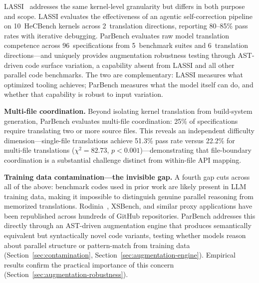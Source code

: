 \documentclass[conference]{IEEEtran}
\begin{document}
LASSI~\cite{LASSI2024} addresses the same kernel-level granularity but differs in both purpose and scope. LASSI evaluates the effectiveness of an agentic self-correction pipeline on 10~HeCBench kernels across 2~translation directions, reporting 80--85\% pass rates with iterative debugging. ParBench evaluates raw model translation competence across 96~specifications from 5~benchmark suites and 6~translation directions---and uniquely provides augmentation robustness testing through AST-driven code surface variation, a capability absent from LASSI and all other parallel code benchmarks. The two are complementary: LASSI measures what optimized tooling achieves; ParBench measures what the model itself can do, and whether that capability is robust to input variation.

\textbf{Multi-file coordination.} Beyond isolating kernel translation from build-system generation, ParBench evaluates multi-file coordination: 25\% of specifications require translating two or more source files. This reveals an independent difficulty dimension---single-file translations achieve 51.3\% pass rate versus 22.2\% for multi-file translations ($\chi^2 = 82.73$, $p < 0.001$)---demonstrating that file-boundary coordination is a substantial challenge distinct from within-file API mapping.

\textbf{Training data contamination---the invisible gap.} A fourth gap cuts across all of the above: benchmark codes used in prior work are likely present in LLM training data, making it impossible to distinguish genuine parallel reasoning from memorized translations. Rodinia~\cite{Rodinia2009}, XSBench, and similar proxy applications have been republished across hundreds of GitHub repositories. ParBench addresses this directly through an AST-driven augmentation engine that produces semantically equivalent but syntactically novel code variants, testing whether models reason about parallel structure or pattern-match from training data (Section~\ref{sec:contamination}, Section~\ref{sec:augmentation-engine}). Empirical results confirm the practical importance of this concern (Section~\ref{sec:augmentation-robustness}).
\end{document}
